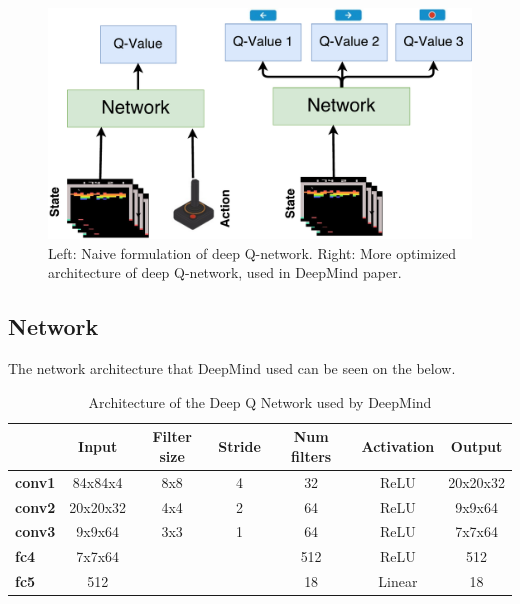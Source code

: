 \begin{figure}[H]
	\centering
	\includegraphics[width=1\textwidth]{Figures/Architecture/DQN/DQN_two_approach.pdf}
	\caption{Left: Naive formulation of deep Q-network. Right: More optimized architecture of deep Q-network, used in DeepMind paper.} 
	\label{fig:DQN_two_approach}
\end{figure}    

\subsection{Network}
The network architecture that DeepMind used can be seen on the  below.

\begin{table}[H]
	\centering
	\caption{Architecture of the Deep Q Network used by DeepMind}
	\label{tab:DQN_network}
	\begin{tabular}{|l|c|c|c|c|c|c|}
		\hline
		\rowcolor[HTML]{9B9B9B} 
		\multicolumn{1}{|c|}{\cellcolor[HTML]{9B9B9B}\textbf{Layer}} & \textbf{Input} & \textbf{Filter size} & \textbf{Stride} & \textbf{Num filters} & \textbf{Activation} & \textbf{Output} \\ \hline
		\cellcolor[HTML]{FFFFFF}\textbf{conv1}                       & 84x84x4        & 8x8                  & 4               & 32                   & ReLU                & 20x20x32        \\ \hline
		\rowcolor[HTML]{C0C0C0} 
		\textbf{conv2}                                               & 20x20x32       & 4x4                  & 2               & 64                   & ReLU                & 9x9x64          \\ \hline
		\cellcolor[HTML]{FFFFFF}\textbf{conv3}                       & 9x9x64         & 3x3                  & 1               & 64                   & ReLU                & 7x7x64          \\ \hline
		\rowcolor[HTML]{C0C0C0} 
		\textbf{fc4}                                                 & 7x7x64         &                      &                 & 512                  & ReLU                & 512             \\ \hline
		\cellcolor[HTML]{FFFFFF}\textbf{fc5}                         & 512            &                      &                 & 18                   & Linear              & 18              \\ \hline
	\end{tabular}
\end{table}

